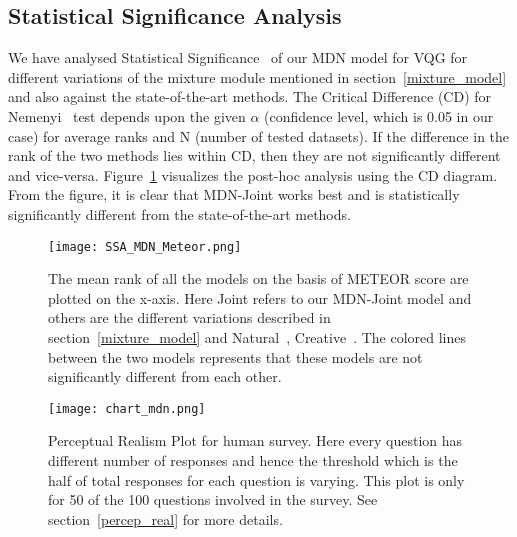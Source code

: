 \documentclass[11pt,a4paper]{article}
\begin{document}
\subsection{Statistical Significance Analysis}
We have analysed Statistical Significance~\cite{Demvsar_JMLR2006} of our MDN model for VQG for different  variations of the mixture module mentioned in section~\ref{mixture_model} and also against the state-of-the-art methods. 
The Critical Difference (CD) for Nemenyi~\cite{Fivser_PLOS2016} test depends upon the given $\alpha$ (confidence level, which is 0.05 in our case) for average ranks and N (number of tested datasets). If the difference in the rank of the two methods lies within CD, then they are not significantly different and vice-versa. Figure~\ref{fig:result_1_B} visualizes the post-hoc analysis using the CD diagram. From the figure, it is clear that MDN-Joint works best and is statistically significantly different from the state-of-the-art methods. 
\begin{figure}[ht]
	\centering
	\texttt{[image: SSA\_MDN\_Meteor.png]}
	\vspace{-0.35cm}
	\caption{The mean rank of all the models on the basis of METEOR score are plotted on the x-axis. Here Joint refers to our MDN-Joint model and others are the different variations described in section~\ref{mixture_model} and Natural~\cite{mostafazadeh2016generating}, Creative~\cite{jain2017creativity}. The colored lines between the two models represents that these models are not significantly different from each other.}
	\label{fig:result_1_B}
\end{figure}
\begin{figure}[ht]
	\centering
	\texttt{[image: chart\_mdn.png]}
	\vspace{-0.89cm}
	\caption{Perceptual Realism Plot for human survey. Here every question has different number of responses and hence the threshold which is the half of total responses for each question is varying. This plot is only for 50 of the 100 questions involved in the survey. See section~\ref{percep_real} for more details.}
	\label{fig:result_2_A}
\end{figure}
\end{document}
